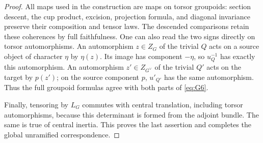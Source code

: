 \begin{proof}
All maps used in the construction are maps on torsor groupoids:
section descent, the cup product, excision, projection formula, and
diagonal invariance preserve their composition and tensor laws.
The descended comparisons retain these coherences by full
faithfulness.  One can also read the two signs directly on torsor
automorphisms.  An automorphism \(z\in Z_G\) of the trivial
\(Q\) acts on a source object of character \(\eta\) by
\(\eta(z)\).  Its image has component \(-\eta\), so
\(u_Q^{-1}\) has exactly this automorphism.  An automorphism
\(z'\in Z_{G^\vee}\) of the trivial \(Q'\) acts on the
target by \(p(z')\); on the source component \(p\),
\(u'_{Q'}\) has the same automorphism.  Thus the full groupoid
formulas agree with both parts of \eqref{eq:G6}.

Finally, tensoring by \(L_G\) commutes with central
translation, including torsor automorphisms, because this determinant
is formed from the adjoint bundle.  The same is true of central
inertia.  This proves the last assertion and completes the global
unramified correspondence.
\end{proof}
